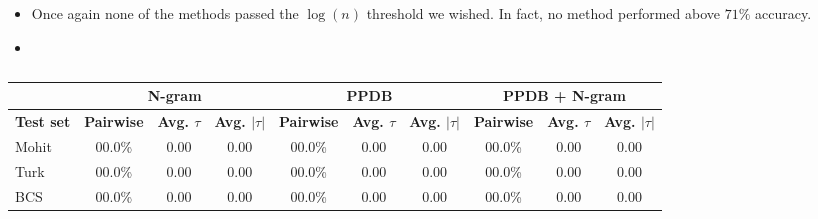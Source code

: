 \begin{itemize}
	\item Once again none of the methods passed the $\log(n)$ threshold we wished. In fact, no method performed above $71\%$ accuracy.
	\item 
\end{itemize}


\begin{table}
\small
\centering
\begin{tabular}{|l|ccc|ccc|ccc|}
	\hline 
	& \multicolumn{3}{c|}{N-gram} 
	& \multicolumn{3}{c|}{PPDB} 
	& \multicolumn{3}{c|}{PPDB + N-gram} \\
	\hline 
	\bf Test set
	& \bf Pairwise & \bf Avg. $\tau$ & \bf Avg. $|\tau|$ 
	& \bf Pairwise & \bf Avg. $\tau$ & \bf Avg. $|\tau|$ 
	& \bf Pairwise & \bf Avg. $\tau$ & \bf Avg. $|\tau|$ \\ 
	\hline
	Mohit & 00.0\%  & 0.00 & 0.00  & 00.0\% & 0.00 & 0.00 & 00.0\% & 0.00 & 0.00 \\ 
	Turk  & 00.0\%  & 0.00 & 0.00  & 00.0\% & 0.00 & 0.00 & 00.0\% & 0.00 & 0.00 \\
	BCS   & 00.0\%  & 0.00 & 0.00  & 00.0\% & 0.00 & 0.00 & 00.0\% & 0.00 & 0.00 \\
	\hline
\end{tabular}
\caption{\label{font-table} }
\end{table}




















